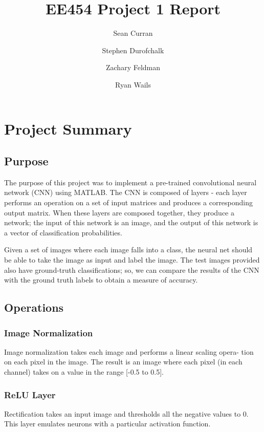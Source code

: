 \documentclass[11pt,english]{article}
\author{Sean Curran \\
\and Stephen Durofchalk \\
\and Zachary Feldman \\
\and Ryan Wails}
\title{EE454 Project 1 Report}
\begin{document}
\maketitle

\newpage
\section{Project Summary}

\subsection{Purpose}
The purpose of this project was to implement a pre-trained convolutional neural network (CNN) using MATLAB.  The CNN is composed of layers - each layer performs an operation on a set of input matrices and produces a corresponding output matrix.  When these layers are composed together, they produce a network; the input of this network is an image, and the output of this network is a vector of classification probabilities.

Given a set of images where each image falls into a class, the neural net should be able to take the image as input and label the image.  The test images provided also have ground-truth classifications; so, we can compare the results of the CNN with the ground truth labels to obtain a measure of accuracy.

\subsection{Operations}

\subsubsection{Image Normalization}

Image normalization takes each image and performs a linear scaling opera-
tion on each pixel in the image. The result is an image where each pixel (in
each channel) takes on a value in the range [-0.5 to 0.5].



\subsubsection{ReLU Layer}

Rectification takes an input image and thresholds all the negative values to 0.  This layer emulates neurons with a particular activation function.
\end{document}
